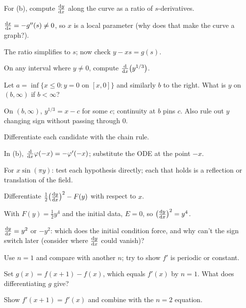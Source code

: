 \begin{hintlevels}
  \item For (b), compute $\frac{\mathrm{d}y}{\mathrm{d}x}$ along the curve as a ratio of
        $s$-derivatives.
  \item $\frac{\mathrm{d}x}{\mathrm{d}s} = -g''(s)\neq 0$, so $x$ is a local parameter (why does that
        make the curve a graph?).
  \item The ratio simplifies to $s$; now check $y - xs = g(s)$.
\end{hintlevels}

\begin{hintlevels}
  \item On any interval where $y\neq 0$, compute $\frac{\mathrm{d}}{\mathrm{d}x}\bigl(y^{1/3}\bigr)$.
  \item Let $a = \inf\{x\le 0 : y = 0 \text{ on } [x,0]\}$ and similarly $b$ to
        the right. What is $y$ on $(b,\infty)$ if $b<\infty$?
  \item On $(b,\infty)$, $y^{1/3} = x - c$ for some $c$; continuity at $b$
        pins $c$. Also rule out $y$ changing sign without passing through $0$.
\end{hintlevels}

\begin{hintlevels}
  \item Differentiate each candidate with the chain rule.
  \item In (b), $\frac{\mathrm{d}}{\mathrm{d}x}\varphi(-x) = -\varphi'(-x)$; substitute the ODE at the
        point $-x$.
  \item For $x\sin(\pi y)$: test each hypothesis directly; each that holds is a
        reflection or translation of the field.
\end{hintlevels}

\begin{hintlevels}
  \item Differentiate $\tfrac12\bigl(\frac{\mathrm{d}y}{\mathrm{d}x}\bigr)^2 - F(y)$ with respect to $x$.
  \item With $F(y) = \tfrac12y^4$ and the initial data, $E = 0$, so
        $\bigl(\frac{\mathrm{d}y}{\mathrm{d}x}\bigr)^2 = y^4$.
  \item $\frac{\mathrm{d}y}{\mathrm{d}x} = y^2$ or $-y^2$: which does the initial condition force,
        and why can't the sign switch later (consider where $\frac{\mathrm{d}y}{\mathrm{d}x}$ could
        vanish)?
\end{hintlevels}

\begin{hintlevels}
  \item Use $n=1$ and compare with another $n$; try to show $f'$ is periodic or
        constant.
  \item Set $g(x) = f(x+1) - f(x)$, which equals $f'(x)$ by $n=1$. What does
        differentiating $g$ give?
  \item Show $f'(x+1) = f'(x)$ and combine with the $n=2$ equation.
\end{hintlevels}


